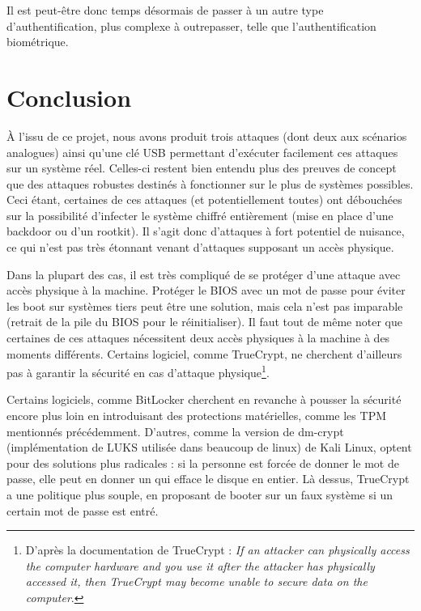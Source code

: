 \documentclass[12pt,a4paper]{article}
\begin{document}
Il est peut-être donc temps désormais de passer à un autre type
d'authentification, plus complexe à outrepasser, telle que l'authentification
biométrique.




\section*{Conclusion}

À l'issu de ce projet, nous avons produit trois attaques (dont deux aux
scénarios analogues) ainsi qu'une clé USB permettant d'exécuter facilement ces
attaques sur un système réel. Celles-ci restent bien entendu plus des preuves
de concept que des attaques robustes destinés à fonctionner sur le plus de
systèmes possibles.  Ceci étant, certaines de ces attaques (et potentiellement
toutes) ont débouchées sur la possibilité d'infecter le système chiffré
entièrement (mise en place d'une backdoor ou d'un rootkit). Il s'agit donc
d'attaques à fort potentiel de nuisance, ce qui n'est pas très étonnant venant
d'attaques supposant un accès physique.

Dans la plupart des cas, il est très compliqué de se protéger d'une attaque
avec accès physique à la machine. Protéger le BIOS avec un mot de passe pour
éviter les boot sur systèmes tiers peut être une solution, mais cela n'est pas
imparable (retrait de la pile du BIOS pour le réinitialiser). Il faut tout de
même noter que certaines de ces attaques nécessitent deux accès physiques à la
machine à des moments différents. Certains logiciel, comme TrueCrypt, ne 
cherchent d'ailleurs pas à garantir la sécurité en cas d'attaque
physique\footnote{\og D'après la documentation de TrueCrypt : \textit{If an
attacker can physically access the computer hardware and you use it after the
attacker has physically accessed it, then TrueCrypt may become unable to secure
data on the computer}.\fg}.

Certains logiciels, comme BitLocker cherchent en revanche à pousser la sécurité
encore plus loin en introduisant des protections matérielles, comme les TPM 
mentionnés précédemment. D'autres, comme la version de dm-crypt (implémentation
de LUKS utilisée dans beaucoup de linux) de Kali Linux, optent pour des solutions
plus radicales : si la personne est forcée de donner le mot de passe, elle peut
en donner un qui efface le disque en entier. Là dessus, TrueCrypt a une politique
plus souple, en proposant de booter sur un \og faux \fg système si un certain
mot de passe est entré.\\
\end{document}

